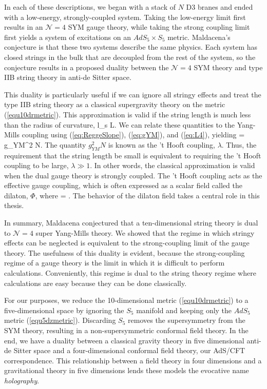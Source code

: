 In each of these descriptions, we began with a stack of $N$ D3 branes and ended with a low-energy, strongly-coupled system.
Taking the low-energy limit first results in an $\mathcal{N}=4$ SYM gauge theory, while taking the strong coupling limit first yields a system of excitations on an $AdS_5 \times S_5$ metric.
Maldacena's conjecture is that these two systems describe the same physics.
Each system has closed strings in the bulk that are decoupled from the rest of the system, so the conjecture results in a proposed duality between the $\mathcal{N}=4$ SYM theory and type IIB string theory in anti-de Sitter space.

This duality is particularly useful if we can ignore all stringy effects and treat the type IIB string theory as a classical supergravity theory on the metric (\ref{equ10drmetric}). 
This approximation is valid if the string length is much less than the radius of curvature,
\be
l_s \ll L.
\ee
We can relate these quantities to the Yang-Mills coupling using (\ref{eq:ReggeSlope}), (\ref{eq:gYM}), and (\ref{eq:L4}), yielding
\be
{} = g_{YM}^2 N.
\ee
The quantity $g_{YM}^2 N$ is known as the 't Hooft coupling, $\lambda$.
Thus, the requirement that the string length be small is equivalent to requiring the 't Hooft coupling to be large, $\lambda \gg 1$.
In other words, the classical approximation is valid when the dual gauge theory is strongly coupled.
The 't Hooft coupling acts as the effective gauge coupling, which is often expressed as a scalar field called the dilaton, $\Phi$, where
\be
\Phi = \log \lambda.
\ee
The behavior of the dilaton field takes a central role in this thesis.

In summary, Maldacena conjectured that a ten-dimensional string theory is dual to $\mathcal{N} = 4 $ super Yang-Mills theory.
We showed that the regime in which stringy effects can be neglected is equivalent to the strong-coupling limit of the gauge theory.
The usefulness of this duality is evident, because the strong-coupling regime of a gauge theory is the limit in which it is difficult to perform calculations.
Conveniently, this regime is dual to the string theory regime where calculations are easy because they can be done classically.

For our purposes, we reduce the 10-dimensional metric (\ref{equ10drmetric}) to a five-dimensional space by ignoring the $S_5$ manifold and keeping only the $AdS_5$ metric (\ref{equ5dzmetric}).
Discarding $S_5$ removes the supersymmetry from the SYM theory, resulting in a non-supersymmetric conformal field theory.
In the end, we have a duality between a classical gravity theory in five dimensional anti-de Sitter space and a four-dimensional conformal field theory, our AdS/CFT correspondence.
This relationship between a field theory in four dimensions and a gravitational theory in five dimensions lends these models the evocative name \emph{holography}.

